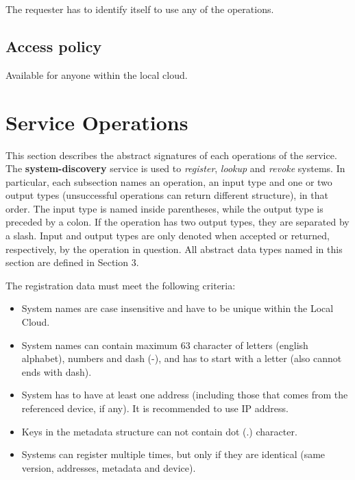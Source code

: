 \documentclass[a4paper]{arrowhead}
\begin{document}
The requester has to identify itself to use any of the operations.

\subsection{Access policy}
\label{sec:accesspolicy}

Available for anyone within the local cloud.

\newpage

\section{Service Operations}
\label{sec:functions}

This section describes the abstract signatures of each operations of the service. The \textbf{system-discovery} service is used to \textit{register}, \textit{lookup} and \textit{revoke} systems.
In particular, each subsection names an operation, an input type and one or two output types (unsuccessful operations can return different structure), in that order.
The input type is named inside parentheses, while the output type is preceded by a colon. If the operation has two output types, they are separated by a slash.
Input and output types are only denoted when accepted or returned, respectively, by the operation in question. All abstract data types named in this section are defined in Section 3.


The registration data must meet the following criteria:

\begin{itemize}
    \item System names are case insensitive and have to be unique within the Local Cloud.
    \item System names can contain maximum 63 character of letters (english alphabet), numbers and dash (-), and has to start with a letter (also cannot ends with dash).
    \item System has to have at least one address (including those that comes from the referenced device, if any). It is recommended to use IP address. 
    \item Keys in the metadata structure can not contain dot (.) character.
    \item Systems can register multiple times, but only if they are identical (same version, addresses, metadata and device).
\end{itemize}
\end{document}
